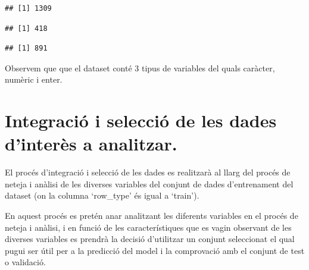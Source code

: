 \documentclass[
]{article}
\newenvironment{Shaded}{\begin{snugshade}}{\end{snugshade}}
\newcommand{\DecValTok}[1]{\textcolor[rgb]{0.86,0.86,0.80}{#1}}
\newcommand{\FunctionTok}[1]{\textcolor[rgb]{0.94,0.94,0.56}{#1}}
\newcommand{\NormalTok}[1]{\textcolor[rgb]{0.80,0.80,0.80}{#1}}
\newcommand{\SpecialCharTok}[1]{\textcolor[rgb]{0.86,0.64,0.64}{#1}}
\newcommand{\StringTok}[1]{\textcolor[rgb]{0.80,0.58,0.58}{#1}}
\begin{document}
\begin{verbatim}
## [1] 1309
\end{verbatim}

\begin{Shaded}
\end{Shaded}

\begin{verbatim}
## [1] 418
\end{verbatim}

\begin{Shaded}
\end{Shaded}

\begin{verbatim}
## [1] 891
\end{verbatim}

Observem que que el dataset conté 3 tipus de variables del quals
caràcter, numèric i enter.

\hypertarget{integraciuxf3-i-selecciuxf3-de-les-dades-dinteruxe8s-a-analitzar.}{%
\section{Integració i selecció de les dades d'interès a
analitzar.}\label{integraciuxf3-i-selecciuxf3-de-les-dades-dinteruxe8s-a-analitzar.}}

El procés d'integració i selecció de les dades es realitzarà al llarg
del procés de neteja i anàlisi de les diverses variables del conjunt de
dades d'entrenament del dataset (on la columna `row\_type' és igual a
`train').

En aquest procés es pretén anar analitzant les diferents variables en el
procés de neteja i anàlisi, i en funció de les característiques que es
vagin observant de les diverses variables es prendrà la decisió
d'utilitzar un conjunt seleccionat el qual pugui ser útil per a la
predicció del model i la comprovació amb el conjunt de test o validació.
\end{document}
